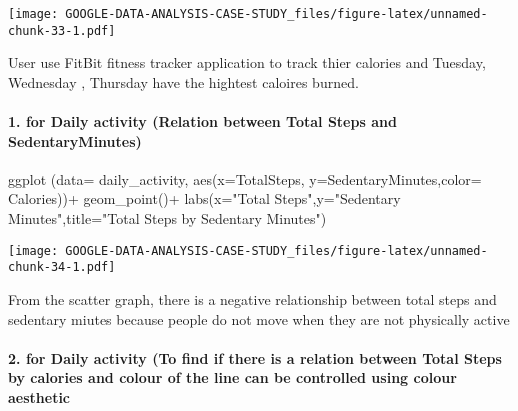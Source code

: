 \documentclass[
]{article}
\newenvironment{Shaded}{\begin{snugshade}}{\end{snugshade}}
\newcommand{\AttributeTok}[1]{\textcolor[rgb]{0.77,0.63,0.00}{#1}}
\newcommand{\FunctionTok}[1]{\textcolor[rgb]{0.00,0.00,0.00}{#1}}
\newcommand{\NormalTok}[1]{#1}
\newcommand{\SpecialCharTok}[1]{\textcolor[rgb]{0.00,0.00,0.00}{#1}}
\newcommand{\StringTok}[1]{\textcolor[rgb]{0.31,0.60,0.02}{#1}}
\begin{document}
\texttt{[image: GOOGLE-DATA-ANALYSIS-CASE-STUDY\_files/figure-latex/unnamed-chunk-33-1.pdf]}

User use FitBit fitness tracker application to track thier calories and
Tuesday, Wednesday , Thursday have the hightest caloires burned.

\hypertarget{for-daily-activity-relation-between-total-steps-and-sedentaryminutes}{%
\paragraph{1. for Daily activity (Relation between Total Steps and
SedentaryMinutes)}\label{for-daily-activity-relation-between-total-steps-and-sedentaryminutes}}

\begin{Shaded}
\begin{Highlighting}[]
\FunctionTok{ggplot}\NormalTok{ (}\AttributeTok{data=}\NormalTok{ daily\_activity, }\FunctionTok{aes}\NormalTok{(}\AttributeTok{x=}\NormalTok{TotalSteps, }\AttributeTok{y=}\NormalTok{SedentaryMinutes,}\AttributeTok{color=}\NormalTok{ Calories))}\SpecialCharTok{+}
  \FunctionTok{geom\_point}\NormalTok{()}\SpecialCharTok{+} \FunctionTok{labs}\NormalTok{(}\AttributeTok{x=}\StringTok{"Total Steps"}\NormalTok{,}\AttributeTok{y=}\StringTok{"Sedentary Minutes"}\NormalTok{,}\AttributeTok{title=}\StringTok{"Total Steps by Sedentary Minutes"}\NormalTok{)}
\end{Highlighting}
\end{Shaded}

\texttt{[image: GOOGLE-DATA-ANALYSIS-CASE-STUDY\_files/figure-latex/unnamed-chunk-34-1.pdf]}

From the scatter graph, there is a negative relationship between total
steps and sedentary miutes because people do not move when they are not
physically active

\hypertarget{for-daily-activity-to-find-if-there-is-a-relation-between-total-steps-by-calories-and-colour-of-the-line-can-be-controlled-using-colour-aesthetic}{%
\paragraph{2. for Daily activity (To find if there is a relation between
Total Steps by calories and colour of the line can be controlled using
colour
aesthetic}\label{for-daily-activity-to-find-if-there-is-a-relation-between-total-steps-by-calories-and-colour-of-the-line-can-be-controlled-using-colour-aesthetic}}
\end{document}
